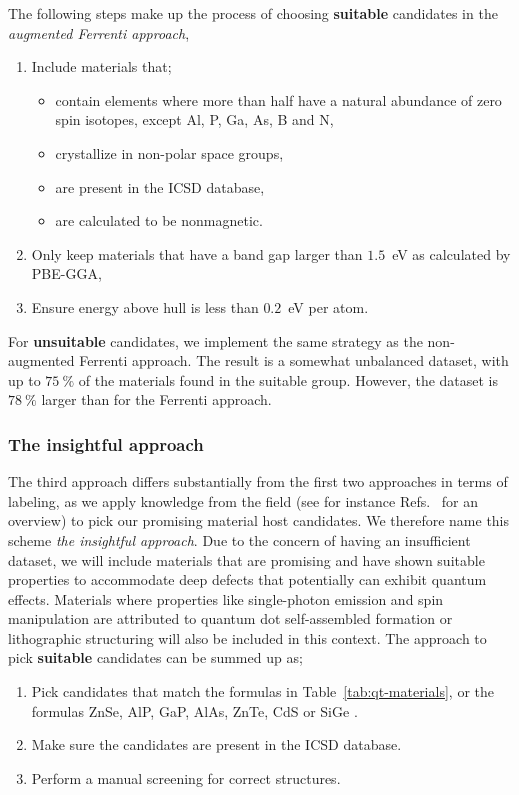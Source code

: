 \documentclass[superscriptaddress,unsortedaddress,
 amsmath,amssymb,
 aps,
]{revtex4-2}
\begin{document}
The following steps make up the process of choosing \textbf{suitable} candidates 
in the \emph{augmented Ferrenti approach},
\begin{enumerate}
    \item Include materials that; 
    \begin{itemize}
        \item contain elements where more than half have a natural abundance of zero spin isotopes, except Al, P, Ga, As, B and N, 
        \item crystallize in non-polar space groups,
        \item are present in the ICSD database,
        \item are calculated to be nonmagnetic. 
    \end{itemize}
    \item Only keep materials that have a band gap larger than $1.5$~eV as calculated by PBE-GGA,
    \item Ensure energy above hull is less than $0.2$~eV per atom. 
\end{enumerate}

For \textbf{unsuitable} candidates, we implement the same strategy as the non-augmented
Ferrenti approach. The result is a somewhat unbalanced dataset, with up to $75 \ \%$ of the 
materials found in the suitable group. However, the dataset is $78 \ \%$ larger than for
the Ferrenti approach.

\subsubsection*{The insightful approach}
The third approach differs substantially from the first two approaches in terms 
of labeling, as we apply knowledge from the field (see for instance Refs.~\cite{Atatuere2018,Zhang2020,Son2020,Toth2019,Bathen2021} for an overview)   
to pick our promising material host candidates. We therefore name this scheme 
\emph{the insightful approach}. 
Due to the concern of having an insufficient dataset, we will include
materials that are promising and have shown suitable properties to 
accommodate deep defects that potentially can exhibit quantum effects. 
Materials where properties like single-photon emission and spin manipulation are attributed to quantum dot self-assembled formation or lithographic structuring will also be included in this context.  
The approach to pick \textbf{suitable} candidates can be summed up as;   
\begin{enumerate}
    \item Pick candidates that match the formulas in Table~\ref{tab:qt-materials}, or the formulas ZnSe,  AlP, GaP, AlAs, ZnTe, CdS \cite{Weber2010} or SiGe \cite{Hardy2019}. 
    \item Make sure the candidates are present in the ICSD database.  
    \item Perform a manual screening for correct structures.
\end{enumerate}
\end{document}
